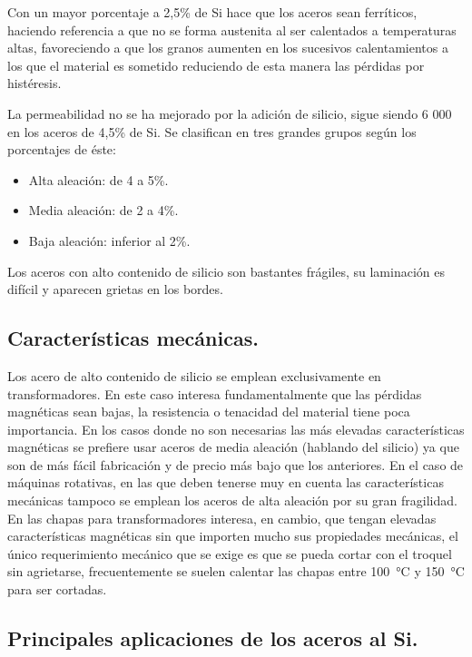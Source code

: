 \documentclass[12pt,a4paper]{article}
\begin{document}
Con un mayor porcentaje a 2,5\% de Si hace que los aceros sean ferríticos, haciendo referencia a que no se forma austenita al ser calentados a temperaturas altas, favoreciendo a que los granos aumenten en los sucesivos calentamientos a los que el material es sometido reduciendo de esta manera las pérdidas por histéresis.

La permeabilidad no se ha mejorado por la adición de silicio, sigue siendo 6 000 en los aceros de 4,5\% de Si. Se clasifican en tres grandes grupos según los porcentajes de éste: 

\begin{itemize}
    \item Alta aleación: de 4 a 5\%.
    \item Media aleación: de 2 a 4\%.
    \item Baja aleación: inferior al 2\%.
\end{itemize}

Los aceros con alto contenido de silicio son bastantes frágiles, su laminación es difícil y aparecen grietas en los bordes.

\subsection{Características mecánicas.}

Los acero de alto contenido de silicio se emplean exclusivamente en transformadores. En este caso interesa fundamentalmente que las pérdidas magnéticas sean bajas, la resistencia o tenacidad del material tiene poca importancia. En los casos donde no son necesarias las más elevadas características magnéticas se prefiere usar aceros de media aleación (hablando del silicio) ya que son de más fácil fabricación y de precio más bajo que los anteriores. En el caso de máquinas rotativas, en las que deben tenerse muy en cuenta las características mecánicas tampoco se emplean los aceros de alta aleación por su gran fragilidad. En las chapas para transformadores interesa, en cambio, que tengan elevadas características magnéticas sin que importen mucho sus propiedades mecánicas, el único requerimiento mecánico que se exige es que se pueda cortar con el troquel sin agrietarse, frecuentemente se suelen calentar las chapas entre \SI{100}{\celsius} y \SI{150}{\celsius} para ser cortadas.

\subsection{Principales aplicaciones de los aceros al Si.}
\end{document}
